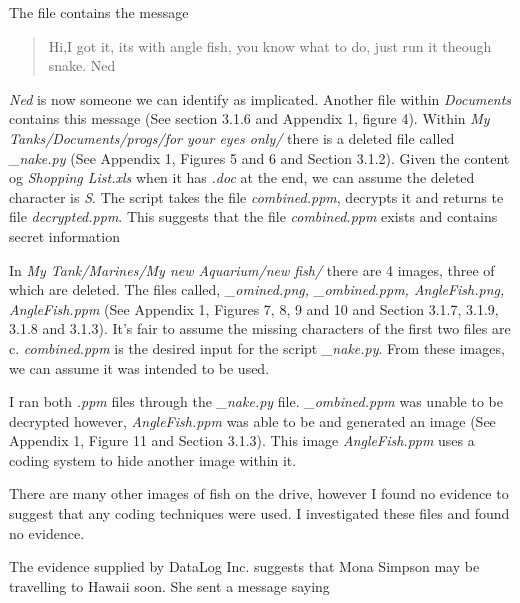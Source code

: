 \documentclass[12pt]{article}
\begin{document}
			The file contains the message\newline

			\begin{quotation}
				\noindent Hi,\newline I got it, its with angle fish, you know what to do, just run it theough snake. \newline Ned 
			\end{quotation}
			
			\noindent \textit{Ned} is now someone we can identify as implicated. Another file within \textit{Documents} contains this message (See section 3.1.6 and Appendix 1, figure 4). \newline
			Within \textit{My Tanks/Documents/progs/for your eyes only/} there is a deleted file called \textit{\_nake.py} (See Appendix 1, Figures 5 and 6 and Section 3.1.2). Given the content og \textit{Shopping List.xls} when it has \textit{.doc} at the end, we can assume the deleted character is \textit{S}. The script takes the file \textit{combined.ppm}, decrypts it and returns te file \textit{decrypted.ppm}. This suggests that the file \textit{combined.ppm} exists and contains secret information 

			\noindent In \textit{My Tank/Marines/My new Aquarium/new fish/} there are 4 images, three of which are deleted. The files called, \textit{\_omined.png, \_ombined.ppm, AngleFish.png, AngleFish.ppm} (See Appendix 1, Figures 7, 8, 9 and 10 and Section 3.1.7, 3.1.9, 3.1.8 and 3.1.3). It's fair to assume the missing characters of the first two files are c. \textit{combined.ppm} is the desired input for the script \textit{\_nake.py}. From these images, we can assume it was intended to be used.\newline

			\noindent I ran both \textit{.ppm} files through the \textit{\_nake.py} file. \textit{\_ombined.ppm} was unable to be decrypted however, \textit{AngleFish.ppm} was able to be and generated an image (See Appendix 1, Figure 11 and Section 3.1.3). This image \textit{AngleFish.ppm} uses a coding system to hide another image within it.\newline

			\noindent There are many other images of fish on the drive, however I found no evidence to suggest that any coding techniques were used. I investigated these files and found no evidence. \newline

			\noindent The evidence supplied by DataLog Inc. suggests that Mona Simpson may be travelling to Hawaii soon. She sent a message saying \newline
\end{document}
